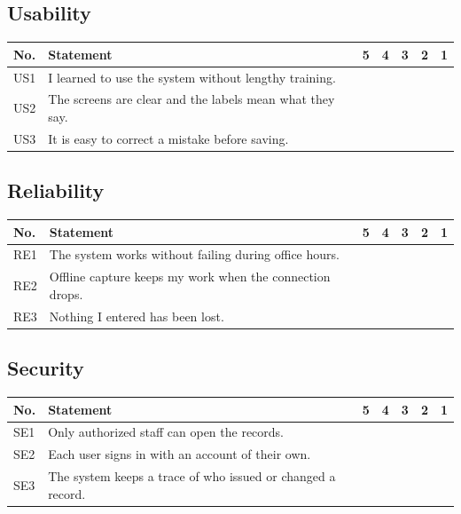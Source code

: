 \documentclass[12pt, a4paper]{report}
\begin{document}
\vspace{0.3cm}
\subsection*{Usability}
\begin{tabular}{|p{1cm}|p{9cm}|p{0.7cm}|p{0.7cm}|p{0.7cm}|p{0.7cm}|p{0.7cm}|}
\hline
\textbf{No.} & \textbf{Statement} & \textbf{5} & \textbf{4} & \textbf{3} & \textbf{2} & \textbf{1} \\
\hline
US1 & I learned to use the system without lengthy training. & & & & & \\
\hline
US2 & The screens are clear and the labels mean what they say. & & & & & \\
\hline
US3 & It is easy to correct a mistake before saving. & & & & & \\
\hline
\end{tabular}

\vspace{0.3cm}
\subsection*{Reliability}
\begin{tabular}{|p{1cm}|p{9cm}|p{0.7cm}|p{0.7cm}|p{0.7cm}|p{0.7cm}|p{0.7cm}|}
\hline
\textbf{No.} & \textbf{Statement} & \textbf{5} & \textbf{4} & \textbf{3} & \textbf{2} & \textbf{1} \\
\hline
RE1 & The system works without failing during office hours. & & & & & \\
\hline
RE2 & Offline capture keeps my work when the connection drops. & & & & & \\
\hline
RE3 & Nothing I entered has been lost. & & & & & \\
\hline
\end{tabular}

\vspace{0.3cm}
\subsection*{Security}
\begin{tabular}{|p{1cm}|p{9cm}|p{0.7cm}|p{0.7cm}|p{0.7cm}|p{0.7cm}|p{0.7cm}|}
\hline
\textbf{No.} & \textbf{Statement} & \textbf{5} & \textbf{4} & \textbf{3} & \textbf{2} & \textbf{1} \\
\hline
SE1 & Only authorized staff can open the records. & & & & & \\
\hline
SE2 & Each user signs in with an account of their own. & & & & & \\
\hline
SE3 & The system keeps a trace of who issued or changed a record. & & & & & \\
\hline
\end{tabular}
\end{document}

